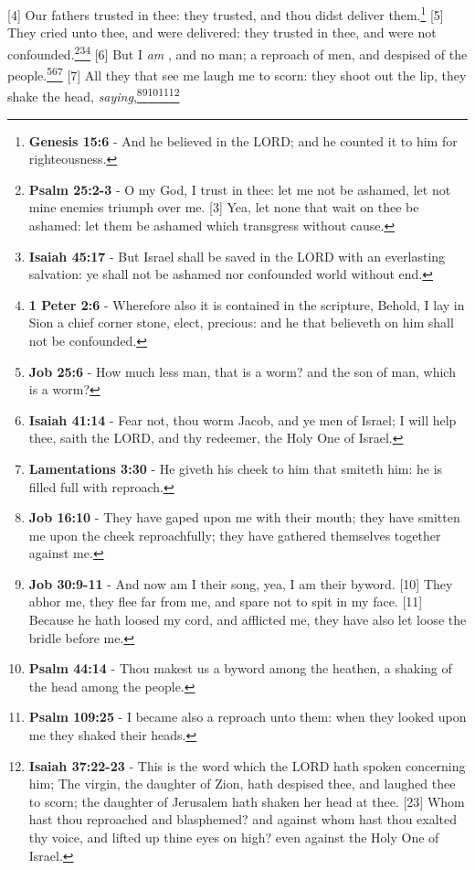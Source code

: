 [4] \textcolor[cmyk]{0.99998,1,0,0}{Our fathers trusted in thee: they trusted, and thou didst deliver them.}\footnote{\textbf{Genesis 15:6} - And he believed in the LORD; and he counted it to him for righteousness.}
[5] \textcolor[cmyk]{0.99998,1,0,0}{They cried unto thee, and were delivered: they trusted in thee, and were not confounded.}\footnote{\textbf{Psalm 25:2-3} - O my God, I trust in thee: let me not be ashamed, let not mine enemies triumph over me. [3] Yea, let none that wait on thee be ashamed: let them be ashamed which transgress without cause.}\footnote{\textbf{Isaiah 45:17} - But Israel shall be saved in the LORD with an everlasting salvation: ye shall not be ashamed nor confounded world without end.}\footnote{\textbf{1 Peter 2:6} - Wherefore also it is contained in the scripture, Behold, I lay in Sion a chief corner stone, elect, precious: and he that believeth on him shall not be confounded.}
[6] \textcolor[cmyk]{0.99998,1,0,0}{But I \emph{am} , and no man; a reproach of men, and despised of the people.}\footnote{\textbf{Job 25:6} - How much less man, that is a worm? and the son of man, which is a worm?}\footnote{\textbf{Isaiah 41:14} - Fear not, thou worm Jacob, and ye men of Israel; I will help thee, saith the LORD, and thy redeemer, the Holy One of Israel.}\footnote{\textbf{Lamentations 3:30} - He giveth his cheek to him that smiteth him: he is filled full with reproach.}
[7] \textcolor[cmyk]{0.99998,1,0,0}{All they that see me laugh me to scorn: they shoot out the lip, they shake the head, \emph{saying},}\footnote{\textbf{Job 16:10} - They have gaped upon me with their mouth; they have smitten me upon the cheek reproachfully; they have gathered themselves together against me.}\footnote{\textbf{Job 30:9-11} - And now am I their song, yea, I am their byword. [10] They abhor me, they flee far from me, and spare not to spit in my face. [11] Because he hath loosed my cord, and afflicted me, they have also let loose the bridle before me.}\footnote{\textbf{Psalm 44:14} - Thou makest us a byword among the heathen, a shaking of the head among the people.}\footnote{\textbf{Psalm 109:25} - I became also a reproach unto them: when they looked upon me they shaked their heads.}\footnote{\textbf{Isaiah 37:22-23} - This is the word which the LORD hath spoken concerning him; The virgin, the daughter of Zion, hath despised thee, and laughed thee to scorn; the daughter of Jerusalem hath shaken her head at thee. [23] Whom hast thou reproached and blasphemed? and against whom hast thou exalted thy voice, and lifted up thine eyes on high? even against the Holy One of Israel.}
